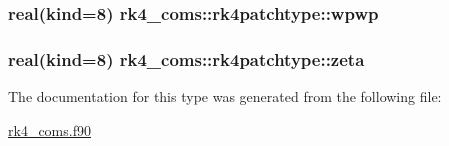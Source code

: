 \subsubsection[{\texorpdfstring{wpwp}{wpwp}}]{\setlength{\rightskip}{0pt plus 5cm}real(kind=8) rk4\+\_\+coms\+::rk4patchtype\+::wpwp}\hypertarget{structrk4__coms_1_1rk4patchtype_a91728bf053cbc9d1a5e1b0d4e6624b64}{}\label{structrk4__coms_1_1rk4patchtype_a91728bf053cbc9d1a5e1b0d4e6624b64}
\subsubsection[{\texorpdfstring{zeta}{zeta}}]{\setlength{\rightskip}{0pt plus 5cm}real(kind=8) rk4\+\_\+coms\+::rk4patchtype\+::zeta}\hypertarget{structrk4__coms_1_1rk4patchtype_a35665ce92058b1d6f19447a08fd3b29f}{}\label{structrk4__coms_1_1rk4patchtype_a35665ce92058b1d6f19447a08fd3b29f}


The documentation for this type was generated from the following file\+:\begin{DoxyCompactItemize}
\item 
\hyperlink{rk4__coms_8f90}{rk4\+\_\+coms.\+f90}\end{DoxyCompactItemize}
